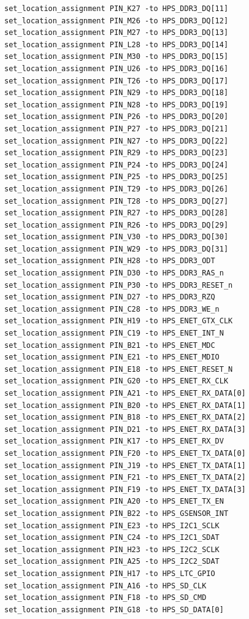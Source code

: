 \documentclass[conference]{IEEEtran}
\begin{document}
\begin{lstlisting}
set_location_assignment PIN_K27 -to HPS_DDR3_DQ[11]
set_location_assignment PIN_M26 -to HPS_DDR3_DQ[12]
set_location_assignment PIN_M27 -to HPS_DDR3_DQ[13]
set_location_assignment PIN_L28 -to HPS_DDR3_DQ[14]
set_location_assignment PIN_M30 -to HPS_DDR3_DQ[15]
set_location_assignment PIN_U26 -to HPS_DDR3_DQ[16]
set_location_assignment PIN_T26 -to HPS_DDR3_DQ[17]
set_location_assignment PIN_N29 -to HPS_DDR3_DQ[18]
set_location_assignment PIN_N28 -to HPS_DDR3_DQ[19]
set_location_assignment PIN_P26 -to HPS_DDR3_DQ[20]
set_location_assignment PIN_P27 -to HPS_DDR3_DQ[21]
set_location_assignment PIN_N27 -to HPS_DDR3_DQ[22]
set_location_assignment PIN_R29 -to HPS_DDR3_DQ[23]
set_location_assignment PIN_P24 -to HPS_DDR3_DQ[24]
set_location_assignment PIN_P25 -to HPS_DDR3_DQ[25]
set_location_assignment PIN_T29 -to HPS_DDR3_DQ[26]
set_location_assignment PIN_T28 -to HPS_DDR3_DQ[27]
set_location_assignment PIN_R27 -to HPS_DDR3_DQ[28]
set_location_assignment PIN_R26 -to HPS_DDR3_DQ[29]
set_location_assignment PIN_V30 -to HPS_DDR3_DQ[30]
set_location_assignment PIN_W29 -to HPS_DDR3_DQ[31]
set_location_assignment PIN_H28 -to HPS_DDR3_ODT
set_location_assignment PIN_D30 -to HPS_DDR3_RAS_n
set_location_assignment PIN_P30 -to HPS_DDR3_RESET_n
set_location_assignment PIN_D27 -to HPS_DDR3_RZQ
set_location_assignment PIN_C28 -to HPS_DDR3_WE_n
set_location_assignment PIN_H19 -to HPS_ENET_GTX_CLK
set_location_assignment PIN_C19 -to HPS_ENET_INT_N
set_location_assignment PIN_B21 -to HPS_ENET_MDC
set_location_assignment PIN_E21 -to HPS_ENET_MDIO
set_location_assignment PIN_E18 -to HPS_ENET_RESET_N
set_location_assignment PIN_G20 -to HPS_ENET_RX_CLK
set_location_assignment PIN_A21 -to HPS_ENET_RX_DATA[0]
set_location_assignment PIN_B20 -to HPS_ENET_RX_DATA[1]
set_location_assignment PIN_B18 -to HPS_ENET_RX_DATA[2]
set_location_assignment PIN_D21 -to HPS_ENET_RX_DATA[3]
set_location_assignment PIN_K17 -to HPS_ENET_RX_DV
set_location_assignment PIN_F20 -to HPS_ENET_TX_DATA[0]
set_location_assignment PIN_J19 -to HPS_ENET_TX_DATA[1]
set_location_assignment PIN_F21 -to HPS_ENET_TX_DATA[2]
set_location_assignment PIN_F19 -to HPS_ENET_TX_DATA[3]
set_location_assignment PIN_A20 -to HPS_ENET_TX_EN
set_location_assignment PIN_B22 -to HPS_GSENSOR_INT
set_location_assignment PIN_E23 -to HPS_I2C1_SCLK
set_location_assignment PIN_C24 -to HPS_I2C1_SDAT
set_location_assignment PIN_H23 -to HPS_I2C2_SCLK
set_location_assignment PIN_A25 -to HPS_I2C2_SDAT
set_location_assignment PIN_H17 -to HPS_LTC_GPIO
set_location_assignment PIN_A16 -to HPS_SD_CLK
set_location_assignment PIN_F18 -to HPS_SD_CMD
set_location_assignment PIN_G18 -to HPS_SD_DATA[0]

\end{lstlisting}
\end{document}
